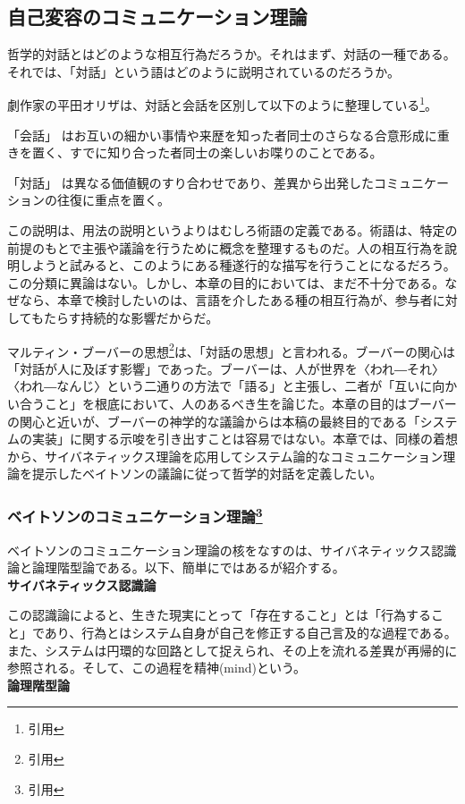 \documentclass[b5j,twoside,twocolumn]{utarticle}
\begin{document}
\subsection{自己変容のコミュニケーション理論}
哲学的対話とはどのような相互行為だろうか。それはまず、対話の一種である。それでは、「対話」という語はどのように説明されているのだろうか。


劇作家の平田オリザは、対話と会話を区別して以下のように整理している\footnote{引用}。
\begin{description}
\item{「会話」} はお互いの細かい事情や来歴を知った者同士のさらなる合意形成に重きを置く、すでに知り合った者同士の楽しいお喋りのことである。
\item{「対話」} は異なる価値観のすり合わせであり、差異から出発したコミュニケーションの往復に重点を置く。
\end{description}
この説明は、用法の説明というよりはむしろ術語の定義である。術語は、特定の前提のもとで主張や議論を行うために概念を整理するものだ。人の相互行為を說明しようと試みると、このようにある種遂行的な描写を行うことになるだろう。
この分類に異論はない。しかし、本章の目的においては、まだ不十分である。なぜなら、本章で検討したいのは、言語を介したある種の相互行為が、参与者に対してもたらす持続的な影響だからだ。


マルティン・ブーバーの思想\footnote{引用}は、「対話の思想」と言われる。ブーバーの関心は「対話が人に及ぼす影響」であった。ブーバーは、人が世界を〈われ―それ〉〈われ―なんじ〉という二通りの方法で「語る」と主張し、二者が「互いに向かい合うこと」を根底において、人のあるべき生を論じた。本章の目的はブーバーの関心と近いが、ブーバーの神学的な議論からは本稿の最終目的である「システムの実装」に関する示唆を引き出すことは容易ではない。本章では、同様の着想から、サイバネティックス理論を応用してシステム論的なコミュニケーション理論を提示したベイトソンの議論に従って哲学的対話を定義したい。


\subsubsection*{ベイトソンのコミュニケーション理論\footnote{引用}}
ベイトソンのコミュニケーション理論の核をなすのは、サイバネティックス認識論と論理階型論である。以下、簡単にではあるが紹介する。\\
\textbf{サイバネティックス認識論}


この認識論によると、生きた現実にとって「存在すること」とは「行為すること」であり、行為とはシステム自身が自己を修正する自己言及的な過程である。また、システムは円環的な回路として捉えられ、その上を流れる差異が再帰的に参照される。そして、この過程を精神(mind)という。\\
\textbf{論理階型論}
\end{document}
